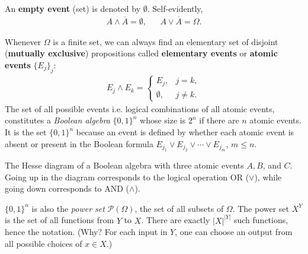 An {\bf empty event} (set) is denoted by $\emptyset$. Self-evidently,
\begin{align}
	A \wedge \overline{A} = \emptyset, && A \vee \overline{A} = \Omega.
\end{align}

Whenever $\Omega$ is a finite set, we can always find an elementary set of disjoint ({\bf mutually exclusive}) propositions called {\bf elementary events} or {\bf atomic events} $\{E_j\}_j$: %
\begin{align}
	E_j \wedge E_k = \begin{cases}
		E_j, & j=k, \\
		\emptyset, & j\neq k.
	\end{cases}
\end{align}
The set of all possible events i.e. logical combinations of all atomic events, constitutes a \emph{Boolean algebra} $\{0,1\}^n$ whose size is $2^n$ if there are $n$ atomic events.
It is the set $\{0,1\}^n$ because an event is defined by whether each atomic event is absent or present in the Boolean formula $E_{j_1} \vee E_{j_2} \vee \cdots \vee E_{j_m}$, $m \le n$.
\begin{marginfigure}
	\centering
	\label{}
	\caption{The Hesse diagram of a Boolean algebra with three atomic events $A, B$, and $C$. Going up in the diagram corresponds to the logical operation OR ($\vee$), while going down corresponds to AND ($\wedge$).}
\end{marginfigure}

\begin{mybox}
	 $\{0,1\}^n$ is also the \emph{power set} $\mathcal{P}(\Omega)$, the set of all subsets of $\Omega$.
	The power set $X^Y$ is the set of all functions from $Y$ to $X$. There are exactly $|X|^{|Y|}$ such functions, hence the notation. (Why? For each input in $Y$, one can choose an output from all possible choices of $x\in X$.)
\end{mybox}


